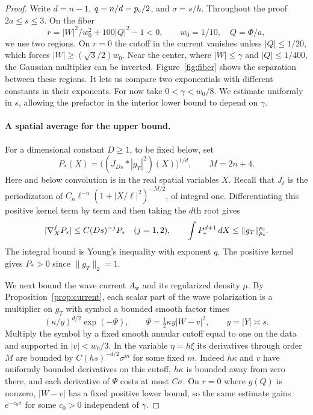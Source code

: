 \begin{proof}
Write $d=n-1$, $q=n/d=p_{\mathrm c}/2$, and $\sigma=s/h$. Throughout the proof
$2a\le s\le3$. On the fiber
\[
 r=|W|^2/w_0^2+100|Q|^2-1<0,\qquad w_0=1/10,\quad Q=\Phi/a,
\]
we use two regions. On $r=0$ the cutoff in the current vanishes unless
$|Q|\le1/20$, which forces $|W|\ge (\sqrt{3}/2)w_0$. Near the center,
where $|W|\le\gamma$ and $|Q|\le1/400$, the Gaussian multiplier can
be inverted. Figure~\ref{fig:fiber} shows the separation between these
regions. It lets us compare two exponentials with different constants
in their exponents. For now take $0<\gamma<w_0/8$. We estimate uniformly in $s$,
allowing the prefactor in the interior lower bound to depend on $\gamma$.



\paragraph{A spatial average for the upper bound.}
For a dimensional constant $D\ge1$, to be fixed below, set
\[
 P_*(X)=\big((J_{Ds}*|g_T|^2)(X)\big)^{1/d},\qquad
 M=2n+4.
\]
Here and below convolution is in the real spatial variables $X$.
Recall that $J_\ell$ is the periodization of
$C_n\ell^{-n}(1+|X/\ell|^2)^{-M/2}$, of integral one. Differentiating this
positive kernel term by term and then taking the $d$th root gives
\begin{equation}\label{eq:barrier-average}
 |\nabla_X^jP_*|\le C(Ds)^{-j}P_*\quad(j=1,2),\qquad
 \int P_*^{d+1}\,dX\le\|g_T\|_{p_{\mathrm c}}^{p_{\mathrm c}}.
\end{equation}
The integral bound is Young's inequality with exponent $q$. The positive
kernel gives $P_*>0$ since $\|g_T\|_2=1$.

We next bound the wave current $A_{\mathrm w}$ and its regularized
density $\mu$. By Proposition~\ref{prop:current}, each scalar part of
the wave polarization is a multiplier on $g_T$ with symbol a bounded
smooth factor times
\[
 (\kappa/y)^{d/2}\exp(-\Psi),\qquad
 \Psi=\tfrac12\kappa y|W-v|^2,\qquad y=|Y|\asymp s.
\]
Multiply the symbol by a fixed smooth annular cutoff equal to one on the
data and supported in $|v|<w_0/3$. In the variable $\eta=h\xi$ its
derivatives through order $M$ are bounded by
$C(hs)^{-d/2}\sigma^m$ for some fixed $m$. Indeed $h\kappa$ and $v$
have uniformly bounded derivatives on this cutoff, $h\kappa$ is bounded
away from zero there, and each derivative of $\Psi$ costs at most
$C\sigma$. On $r=0$ where $g(Q)$ is nonzero, $|W-v|$ has a fixed
positive lower bound, so the same estimate gains $e^{-c_0\sigma}$ for
some $c_0>0$ independent of $\gamma$.


\end{proof}
